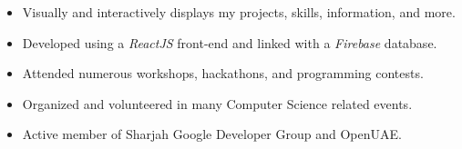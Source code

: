 \documentclass[10pt,a4paper]{altacv}
\begin{document}
\divider

\begin{itemize}
  \item Visually and interactively displays my projects, skills, information, and more.
  \item Developed using a \emph{ReactJS} front-end and linked with a \emph{Firebase} database.
\end{itemize}
\smallskip

\begin{itemize}
  \item Attended numerous workshops, hackathons, and programming contests.
  \item Organized and volunteered in many Computer Science related events.
  \item Active member of Sharjah Google Developer Group and OpenUAE.
\end{itemize}
\end{document}
